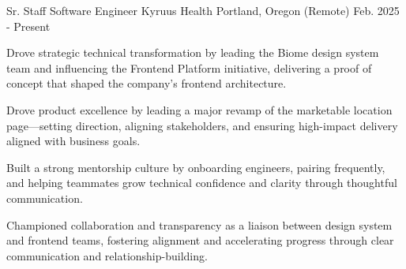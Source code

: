 

\begin{cventries}

  \cventry
    {Sr. Staff Software Engineer} %
    {Kyruus Health} %
    {Portland, Oregon (Remote)} %
    {Feb. 2025 - Present} %
    {
      \begin{cvitems} %
        \item {Drove strategic technical transformation by leading the Biome design system team and influencing the Frontend Platform initiative, delivering a proof of concept that shaped the company's frontend architecture.}
        \item {Drove product excellence by leading a major revamp of the marketable location page—setting direction, aligning stakeholders, and ensuring high-impact delivery aligned with business goals.}
        \item {Built a strong mentorship culture by onboarding engineers, pairing frequently, and helping teammates grow technical confidence and clarity through thoughtful communication.}
        \item {Championed collaboration and transparency as a liaison between design system and frontend teams, fostering alignment and accelerating progress through clear communication and relationship-building.}
      \end{cvitems}
    }


\end{cventries}
